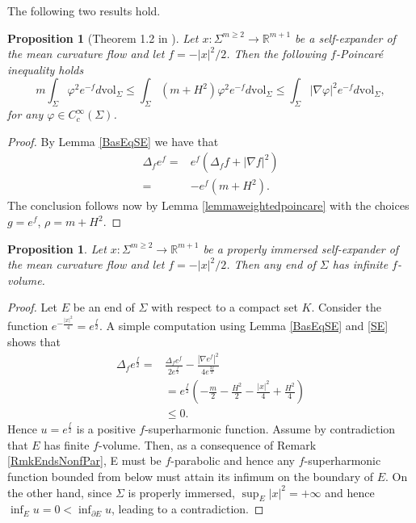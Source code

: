 \documentclass[11pt, leqno]{amsart}
\newtheorem{proposition}[theorem]{Proposition}
\begin{document}
The following two results hold.

\begin{proposition}[Theorem 1.2 in \cite{ChengZhou_Selfexp}]\label{propfpoincareexpanders}
Let $x:\Sigma^{m\geq 2}\to\mathbb{R}^{m+1}$ be a self-expander of the mean curvature flow and let $f=-|x|^2/2$. Then the following $f$-Poincar\'e inequality holds
\begin{equation}\label{eqfpoincareexpanders}
m\int_\Sigma \varphi^2 e^{-f}d\mathrm{vol}_{\Sigma}\leq \int_\Sigma (m+H^2) \varphi^2 e^{-f}d\mathrm{vol}_{\Sigma}\leq \int_\Sigma |\nabla \varphi|^2 e^{-f}d\mathrm{vol}_{\Sigma},
\end{equation}
for any $\varphi\in C^{\infty}_c(\Sigma)$.
\end{proposition}
\begin{proof}
By Lemma \ref{BasEqSE} we have that 
\begin{align*}
\Delta_f e^{f}=&e^f\left(\Delta_f f+|\nabla f|^2\right)\\
=& -e^f \left(m+H^2\right).
\end{align*}
The conclusion follows now by Lemma \ref{lemmaweightedpoincare} with the choices $g=e^f$, $\rho=m+H^2$.
\end{proof}

\begin{proposition}
Let $x:\Sigma^{m\geq 2}\to\mathbb{R}^{m+1}$ be a properly immersed self-expander of the mean curvature flow and let $f=-|x|^2/2$. Then any end of $\Sigma$ has infinite $f$-volume.
\end{proposition}
\begin{proof}
Let $E$ be an end of $\Sigma$ with respect to a compact set $K$. Consider the function $e^{-\frac{|x|^2}{4}}=e^{\frac{f}{2}}$. A simple computation using Lemma \ref{BasEqSE} and \eqref{SE} shows that
\begin{align*}
\Delta_f e^{\frac{f}{2}}=&\frac{\Delta_{f}e^{f}}{2e^{\frac{f}{2}}}-\frac{|\nabla e^{f}|^2}{4e^{\frac{3f}{2}}}\\
&= e^{\frac{f}{2}} \left(-\frac{m}{2}-\frac{H^2}{2}-\frac{|x|^2}{4}+\frac{H^2}{4}\right)\\
&\leq 0.
\end{align*}
Hence $u=e^{\frac{f}{2}}$ is a positive $f$-superharmonic function. Assume by contradiction that $E$ has finite $f$-volume. Then, as a consequence of Remark \ref{RmkEndsNonfPar}, E must be $f$-parabolic and hence any $f$-superharmonic function bounded from below must attain its infimum on the boundary of $E$. On the other hand, since $\Sigma$ is properly immersed, $\sup_E |x|^2=+\infty$ and hence $\inf_E  u=0<\inf_{\partial E} u$, leading to a contradiction.
\end{proof}
\end{document}
